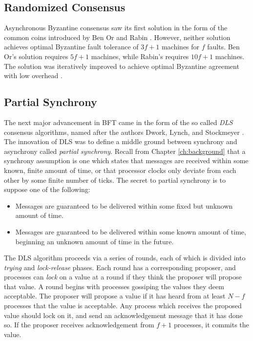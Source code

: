 \subsection{Randomized Consensus}

Asynchronous Byzantine consensus saw its first solution in the form of the common coins
introduced by Ben Or \cite{free-choice} and Rabin \cite{rabin1983randomized}.
However, neither solution achieves optimal Byzantine fault tolerance of $3f+1$ machines for $f$ faults.
Ben Or's solution requires $5f+1$ machines, while Rabin's requires $10f+1$ machines.
The solution was iteratively improved to achieve optimal Byzantine agreement with low overhead \cite{feldman1988optimal,canetti1993fast,cachin2000random}.

\subsection{Partial Synchrony}

The next major advancement in BFT came in the form of the so called \emph{DLS} consensus algorithms,
named after the authors Dwork, Lynch, and Stockmeyer \cite{dls}.
The innovation of DLS was to define a middle ground between synchrony and asynchrony called \emph{partial synchrony}.
Recall from Chapter \ref{ch:background} that a synchrony assumption is one which states that messages 
are received within some known, finite amount of time, 
or that processor clocks only deviate from each other by some finite number of ticks.
The secret to partial synchrony is to suppose one of the following:

\begin{itemize}
\item{Messages are guaranteed to be delivered within some fixed but unknown amount of time.}
\item{Messages are guaranteed to be delivered within some known amount of time, beginning an unknown amount of time in the future.}
\end{itemize}

The DLS algorithm proceeds via a series of rounds, each of which is divided into \emph{trying} and \emph{lock-release} phases.
Each round has a corresponding proposer, and processes can \emph{lock} on a value at a round if they think
the proposer will propose that value.
A round begins with processes gossiping the values they deem acceptable.
The proposer will propose a value if it has heard from at least $N - f$ processes that the value is acceptable.
Any process which receives the proposed value should lock on it, and send an acknowledgement message
that it has done so.
If the proposer receives acknowledgement from $f+1$ processes, it commits the value.

